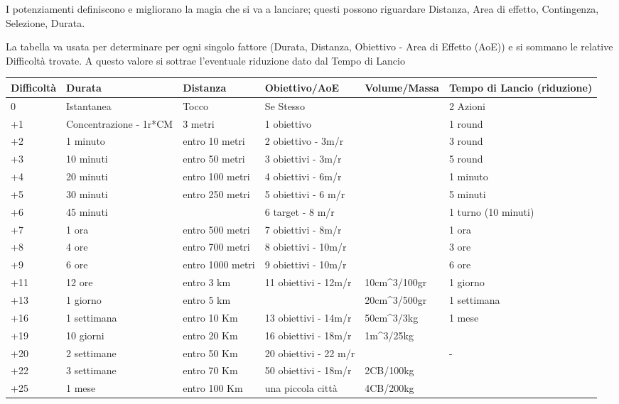 \documentclass[a4paper,10 pt,twoside,openany]{book}
\begin{document}
I potenziamenti definiscono e migliorano la magia che si va a lanciare; questi possono riguardare Distanza, Area di effetto, Contingenza, Selezione, Durata.

La tabella va usata per determinare per ogni singolo fattore (Durata, Distanza, Obiettivo - Area di Effetto (AoE)) e si sommano le relative Difficoltà trovate.
A questo valore si sottrae l'eventuale riduzione dato dal Tempo di Lancio


\bigskip

\begin{tabularx}{0.95\textwidth}{lXXXXX}
	\hline
	\textbf{Difficoltà} &\textbf{Durata} &\textbf{Distanza} &\textbf{Obiettivo/AoE} & \textbf{Volume/Massa} &\textbf{Tempo di Lancio (riduzione)} \\
	\hline
	0	& Istantanea		& Tocco	& Se Stesso&& 2 Azioni\\
	\hline
	+1	& Concentrazione - 1r*CM	& 3 metri& 1 obiettivo&& 1 round\\
	\hline
	+2	& 1 minuto	& entro 10 metri&2 obiettivo - 3m/r&& 3 round\\
	\hline
	+3	&	10 minuti& entro 50 metri& 3 obiettivi - 3m/r&& 5 round\\
	\hline
	+4	& 20 minuti	& entro 100 metri&4 obiettivi - 6m/r &&1 minuto\\
	\hline
	+5&30 minuti&entro 250 metri&5 obiettivi - 6 m/r&&5 minuti\\
	\hline
	+6&45 minuti&&6 target - 8 m/r&&1 turno (10 minuti)\\
	\hline
	+7&1 ora&entro 500 metri&7 obiettivi - 8m/r&&1 ora\\
	\hline
	+8&4 ore&entro 700 metri&8 obiettivi - 10m/r&&3 ore\\
	\hline
	+9&6 ore&entro 1000 metri&9 obiettivi - 10m/r&&6 ore\\
	\hline
	+11&12 ore&entro 3 km&11 obiettivi - 12m/r& 10cm\^{}3/100gr&1 giorno\\
	\hline
	+13&1 giorno&entro 5 km&&20cm\^{}3/500gr&1 settimana\\
	\hline
	+16&1 settimana&entro 10 Km&13 obiettivi - 14m/r&50cm\^{}3/3kg&1 mese\\
	\hline
	+19&10 giorni&entro 20 Km&16 obiettivi - 18m/r&1m\^{}3/25kg&\\
	\hline
	+20&2 settimane&entro 50 Km&20 obiettivi - 22 m/r&&-\\
	\hline
	+22&3 settimane&entro 70 Km&50 obiettivi - 18m/r&2CB/100kg&\\
	\hline
	+25&1 mese&entro 100 Km&una piccola città&4CB/200kg&\\

\end{tabularx}
\end{document}
